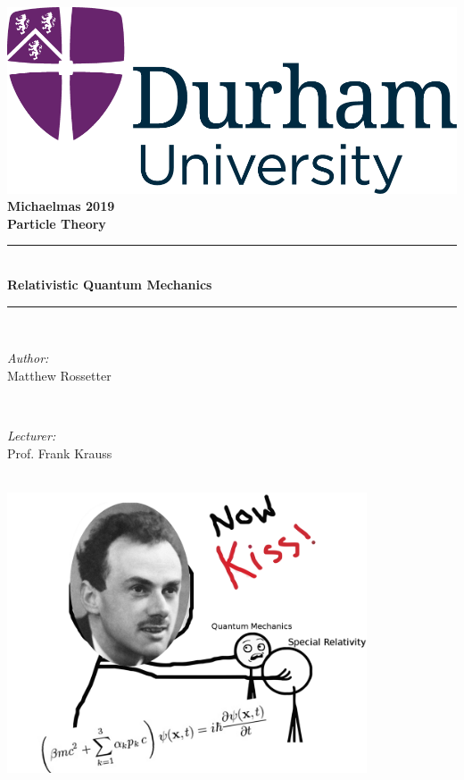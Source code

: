 \documentclass[a4paper, 11pt, normalem]{report}
\begin{document}
\begin{titlepage}
    \newcommand{\HRule}{\rule{\linewidth}{0.5mm}}
    \center
    {\includegraphics[scale=0.5]{../../logo0.png}\hfill{\Large\bfseries Michaelmas 2019}}\\[2.5cm]
    {\LARGE\bfseries Particle Theory}\\[1.5cm]
    \HRule \\[0.7cm]
    {\huge\bfseries Relativistic Quantum Mechanics}\\[0.4cm]
    \HRule \\[1.5cm]

    \begin{minipage}{0.4\textwidth}
        \begin{flushleft} \large
            \emph{Author:} \\ Matthew Rossetter
        \end{flushleft}
    \end{minipage}~
    \begin{minipage}{0.4\textwidth}
        \begin{flushright} \large
            \emph{Lecturer:} \\ Prof. Frank Krauss
        \end{flushright}
    \end{minipage}\\[2cm]
    \vfill
    \includegraphics[width=0.8\textwidth]{rqm.png}\\[1cm]
    \vfill
\end{titlepage}
\tableofcontents
\end{document}
